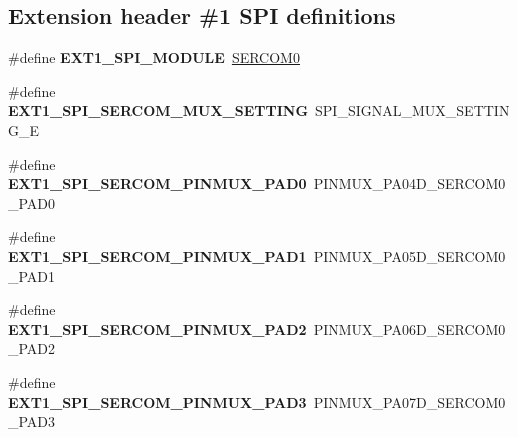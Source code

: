 \subsection*{Extension header \#1 S\+P\+I definitions}
\begin{DoxyCompactItemize}
\item 
\hypertarget{group__saml21__xplained__pro__features__group_gaa2643abcb5f9bf242d4854055a250370}{}\#define {\bfseries E\+X\+T1\+\_\+\+S\+P\+I\+\_\+\+M\+O\+D\+U\+L\+E}~\hyperlink{group___s_a_m_l21_j18_a__base_gae5473788457bad0e69ad9d7f22ed404f}{S\+E\+R\+C\+O\+M0}\label{group__saml21__xplained__pro__features__group_gaa2643abcb5f9bf242d4854055a250370}

\item 
\hypertarget{group__saml21__xplained__pro__features__group_ga8063a4c2e063318656a5441c80f53c0c}{}\#define {\bfseries E\+X\+T1\+\_\+\+S\+P\+I\+\_\+\+S\+E\+R\+C\+O\+M\+\_\+\+M\+U\+X\+\_\+\+S\+E\+T\+T\+I\+N\+G}~S\+P\+I\+\_\+\+S\+I\+G\+N\+A\+L\+\_\+\+M\+U\+X\+\_\+\+S\+E\+T\+T\+I\+N\+G\+\_\+\+E\label{group__saml21__xplained__pro__features__group_ga8063a4c2e063318656a5441c80f53c0c}

\item 
\hypertarget{group__saml21__xplained__pro__features__group_gaf15f22ea20148abf9d81973b73a76db6}{}\#define {\bfseries E\+X\+T1\+\_\+\+S\+P\+I\+\_\+\+S\+E\+R\+C\+O\+M\+\_\+\+P\+I\+N\+M\+U\+X\+\_\+\+P\+A\+D0}~P\+I\+N\+M\+U\+X\+\_\+\+P\+A04\+D\+\_\+\+S\+E\+R\+C\+O\+M0\+\_\+\+P\+A\+D0\label{group__saml21__xplained__pro__features__group_gaf15f22ea20148abf9d81973b73a76db6}

\item 
\hypertarget{group__saml21__xplained__pro__features__group_gabc7df5d710abfad71024f9aedc538990}{}\#define {\bfseries E\+X\+T1\+\_\+\+S\+P\+I\+\_\+\+S\+E\+R\+C\+O\+M\+\_\+\+P\+I\+N\+M\+U\+X\+\_\+\+P\+A\+D1}~P\+I\+N\+M\+U\+X\+\_\+\+P\+A05\+D\+\_\+\+S\+E\+R\+C\+O\+M0\+\_\+\+P\+A\+D1\label{group__saml21__xplained__pro__features__group_gabc7df5d710abfad71024f9aedc538990}

\item 
\hypertarget{group__saml21__xplained__pro__features__group_ga6e40d3a1db63f7144c61706f13fd0164}{}\#define {\bfseries E\+X\+T1\+\_\+\+S\+P\+I\+\_\+\+S\+E\+R\+C\+O\+M\+\_\+\+P\+I\+N\+M\+U\+X\+\_\+\+P\+A\+D2}~P\+I\+N\+M\+U\+X\+\_\+\+P\+A06\+D\+\_\+\+S\+E\+R\+C\+O\+M0\+\_\+\+P\+A\+D2\label{group__saml21__xplained__pro__features__group_ga6e40d3a1db63f7144c61706f13fd0164}

\item 
\hypertarget{group__saml21__xplained__pro__features__group_ga6a6ce015c66176cb4e9497d5d11bc0f7}{}\#define {\bfseries E\+X\+T1\+\_\+\+S\+P\+I\+\_\+\+S\+E\+R\+C\+O\+M\+\_\+\+P\+I\+N\+M\+U\+X\+\_\+\+P\+A\+D3}~P\+I\+N\+M\+U\+X\+\_\+\+P\+A07\+D\+\_\+\+S\+E\+R\+C\+O\+M0\+\_\+\+P\+A\+D3\label{group__saml21__xplained__pro__features__group_ga6a6ce015c66176cb4e9497d5d11bc0f7}


\end{DoxyCompactItemize}
